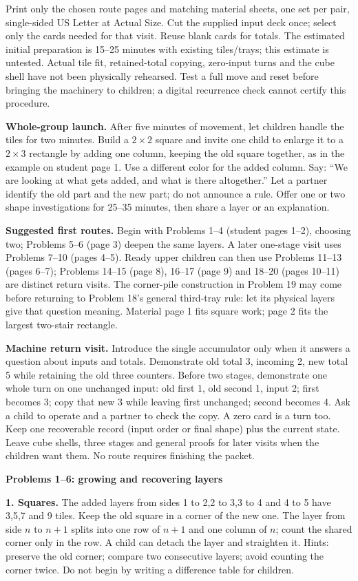 \documentclass[11pt]{article}
\newcommand{\heading}[1]{\par\textbf{#1}\par}
\begin{document}
Print only the chosen route pages and matching material sheets, one set per pair, single-sided US Letter at Actual Size. Cut the supplied input deck once; select only the cards needed for that visit. Reuse blank cards for totals. The estimated initial preparation is 15--25 minutes with existing tiles/trays; this estimate is untested. Actual tile fit, retained-total copying, zero-input turns and the cube shell have not been physically rehearsed. Test a full move and reset before bringing the machinery to children; a digital recurrence check cannot certify this procedure.

\textbf{Whole-group launch.} After five minutes of movement, let children handle the tiles for two minutes. Build a $2\times 2$ square and invite one child to enlarge it to a $2\times 3$ rectangle by adding one column, keeping the old square together, as in the example on student page 1. Use a different color for the added column. Say: ``We are looking at what gets added, and what is there altogether.'' Let a partner identify the old part and the new part; do not announce a rule. Offer one or two shape investigations for 25--35 minutes, then share a layer or an explanation.

\textbf{Suggested first routes.} Begin with Problems 1--4 (student pages 1--2), choosing two; Problems 5--6 (page 3) deepen the same layers. A later one-stage visit uses Problems 7--10 (pages 4--5). Ready upper children can then use Problems 11--13 (pages 6--7); Problems 14--15 (page 8), 16--17 (page 9) and 18--20 (pages 10--11) are distinct return visits. The corner-pile construction in Problem 19 may come before returning to Problem 18's general third-tray rule: let its physical layers give that question meaning. Material page 1 fits square work; page 2 fits the largest two-stair rectangle.

\textbf{Machine return visit.} Introduce the single accumulator only when it answers a question about inputs and totals. Demonstrate old total 3, incoming 2, new total 5 while retaining the old three counters. Before two stages, demonstrate one whole turn on one unchanged input: old first 1, old second 1, input 2; first becomes 3; copy that new 3 while leaving first unchanged; second becomes 4. Ask a child to operate and a partner to check the copy. A zero card is a turn too. Keep one recoverable record (input order or final shape) plus the current state. Leave cube shells, three stages and general proofs for later visits when the children want them. No route requires finishing the packet.
\newpage
\heading{Problems 1--6: growing and recovering layers}
\textbf{1. Squares.} The added layers from sides 1 to 2,2 to 3,3 to 4 and 4 to 5 have 3,5,7 and 9 tiles. Keep the old square in a corner of the new one. The layer from side $n$ to $n+1$ splits into one row of $n+1$ and one column of $n$; count the shared corner only in the row. A child can detach the layer and straighten it. Hints: preserve the old corner; compare two consecutive layers; avoid counting the corner twice. Do not begin by writing a difference table for children.
\end{document}
